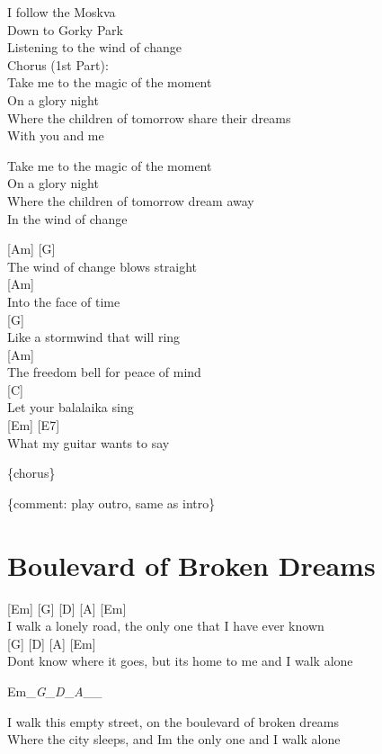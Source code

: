 \documentclass[
  letterpaper,
]{scrbook}
\begin{document}
I follow the Moskva\\
Down to Gorky Park\\
Listening to the wind of change\\
Chorus (1st Part):\\
Take me to the magic of the moment\\
On a glory night\\
Where the children of tomorrow share their dreams\\
With you and me

Take me to the magic of the moment\\
On a glory night\\
Where the children of tomorrow dream away\\
In the wind of change

{[}Am{]} {[}G{]}\\
The wind of change blows straight\\
{[}Am{]}\\
Into the face of time\\
{[}G{]}\\
Like a stormwind that will ring\\
{[}Am{]}\\
The freedom bell for peace of mind\\
{[}C{]}\\
Let your balalaika sing\\
{[}Em{]} {[}E7{]}\\
What my guitar wants to say

\{chorus\}

\{comment: play outro, same as intro\}

\hypertarget{boulevard-of-broken-dreams}{%
\chapter{Boulevard of Broken Dreams}\label{boulevard-of-broken-dreams}}

{[}Em{]} {[}G{]} {[}D{]} {[}A{]} {[}Em{]}\\
I walk a lonely road, the only one that I have ever known\\
{[}G{]} {[}D{]} {[}A{]} {[}Em{]}\\
Don\textquotesingle t know where it goes, but it\textquotesingle s home
to me and I walk alone

Em\_\emph{\textbar G}\_\emph{\textbar D}\_\emph{\textbar A}\_\_\textbar{}

I walk this empty street, on the boulevard of broken dreams\\
Where the city sleeps, and I\textquotesingle m the only one and I walk
alone
\end{document}
